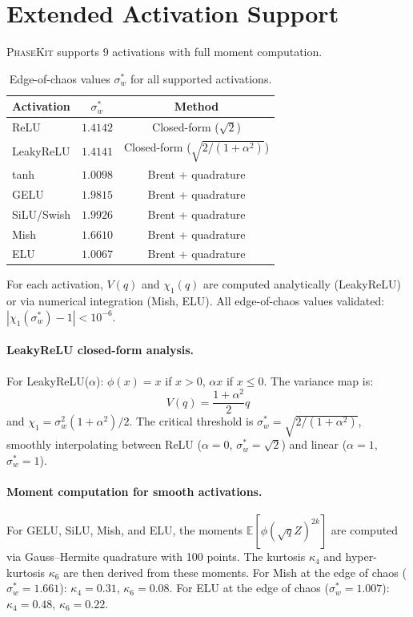 \documentclass[10pt]{article}
\newcommand{\EE}{\mathbb{E}}
\newcommand{\ToolName}{\textsc{PhaseKit}}
\begin{document}
\section{Extended Activation Support}
\label{app:extended-act}

\ToolName{} supports 9 activations with full moment computation.

\begin{table}[h]
\centering
\caption{Edge-of-chaos values $\sigma_w^*$ for all supported activations.}
\label{tab:eoc-extended}
\small
\begin{tabular}{@{}lcc@{}}
\toprule
\textbf{Activation} & $\sigma_w^*$ & \textbf{Method} \\
\midrule
ReLU        & $1.4142$ & Closed-form ($\sqrt{2}$) \\
LeakyReLU   & $1.4141$ & Closed-form ($\sqrt{2/(1+\alpha^2)}$) \\
tanh        & $1.0098$ & Brent + quadrature \\
GELU        & $1.9815$ & Brent + quadrature \\
SiLU/Swish  & $1.9926$ & Brent + quadrature \\
Mish        & $1.6610$ & Brent + quadrature \\
ELU         & $1.0067$ & Brent + quadrature \\
\bottomrule
\end{tabular}
\end{table}

For each activation, $V(q)$ and $\chi_1(q)$ are computed analytically (LeakyReLU) or via numerical integration (Mish, ELU).
All edge-of-chaos values validated: $|\chi_1(\sigma_w^*) - 1| < 10^{-6}$.

\paragraph{LeakyReLU closed-form analysis.}
For LeakyReLU($\alpha$): $\phi(x) = x$ if $x > 0$, $\alpha x$ if $x \leq 0$.
The variance map is:
\begin{equation}
    V(q) = \frac{1+\alpha^2}{2} q
\end{equation}
and $\chi_1 = \sigma_w^2 (1+\alpha^2)/2$.
The critical threshold is $\sigma_w^* = \sqrt{2/(1+\alpha^2)}$, smoothly interpolating between ReLU ($\alpha=0$, $\sigma_w^*=\sqrt{2}$) and linear ($\alpha=1$, $\sigma_w^*=1$).

\paragraph{Moment computation for smooth activations.}
For GELU, SiLU, Mish, and ELU, the moments $\EE[\phi(\sqrt{q}Z)^{2k}]$ are computed via Gauss--Hermite quadrature with 100 points.
The kurtosis $\kappa_4$ and hyper-kurtosis $\kappa_6$ are then derived from these moments.
For Mish at the edge of chaos ($\sigma_w^* = 1.661$): $\kappa_4 = 0.31$, $\kappa_6 = 0.08$.
For ELU at the edge of chaos ($\sigma_w^* = 1.007$): $\kappa_4 = 0.48$, $\kappa_6 = 0.22$.
\end{document}
